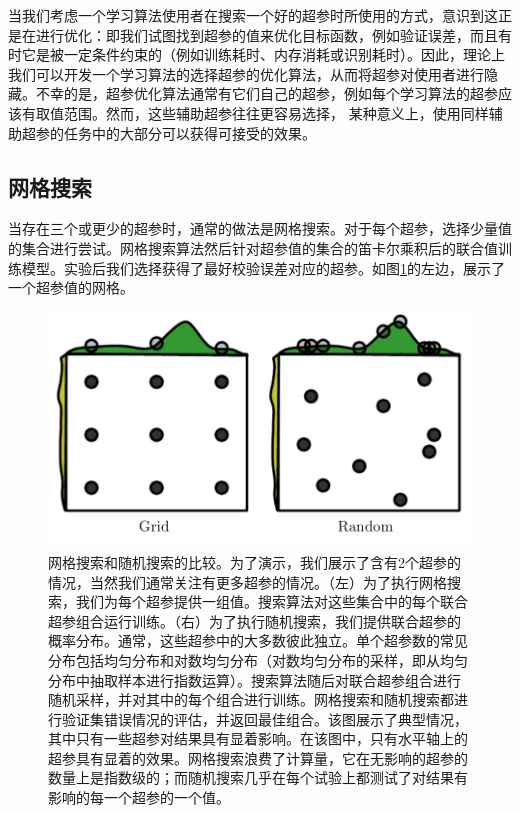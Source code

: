 当我们考虑一个学习算法使用者在搜索一个好的超参时所使用的方式，意识到这正是在进行优化：即我们试图找到超参的值来优化目标函数，例如验证误差，而且有时它是被一定条件约束的（例如训练耗时、内存消耗或识别耗时）。因此，理论上我们可以开发一个学习算法的选择超参的优化算法，从而将超参对使用者进行隐藏。不幸的是，超参优化算法通常有它们自己的超参，例如每个学习算法的超参应该有取值范围。然而，这些辅助超参往往更容易选择， 某种意义上，使用同样辅助超参的任务中的大部分可以获得可接受的效果。

\subsection{网格搜索}
\label{sec:11.4.3}

当存在三个或更少的超参时，通常的做法是网格搜索。对于每个超参，选择少量值的集合进行尝试。网格搜索算法然后针对超参值的集合的笛卡尔乘积后的联合值训练模型。实验后我们选择获得了最好校验误差对应的超参。如图\ref{fig:11_2}的左边，展示了一个超参值的网格。

\begin{figure}[htbp] %
   \centering
   \includegraphics[width=6in]{fig/chap11/11_2.png} 
   \caption{网格搜索和随机搜索的比较。为了演示，我们展示了含有2个超参的情况，当然我们通常关注有更多超参的情况。（左）为了执行网格搜索，我们为每个超参提供一组值。搜索算法对这些集合中的每个联合超参组合运行训练。（右）为了执行随机搜索，我们提供联合超参的概率分布。通常，这些超参中的大多数彼此独立。单个超参数的常见分布包括均匀分布和对数均匀分布（对数均匀分布的采样，即从均匀分布中抽取样本进行指数运算）。搜索算法随后对联合超参组合进行随机采样，并对其中的每个组合进行训练。网格搜索和随机搜索都进行验证集错误情况的评估，并返回最佳组合。该图展示了典型情况，其中只有一些超参对结果具有显着影响。在该图中，只有水平轴上的超参具有显着的效果。网格搜索浪费了计算量，它在无影响的超参的数量上是指数级的；而随机搜索几乎在每个试验上都测试了对结果有影响的每一个超参的一个值。}
   \label{fig:11_2}
\end{figure}

